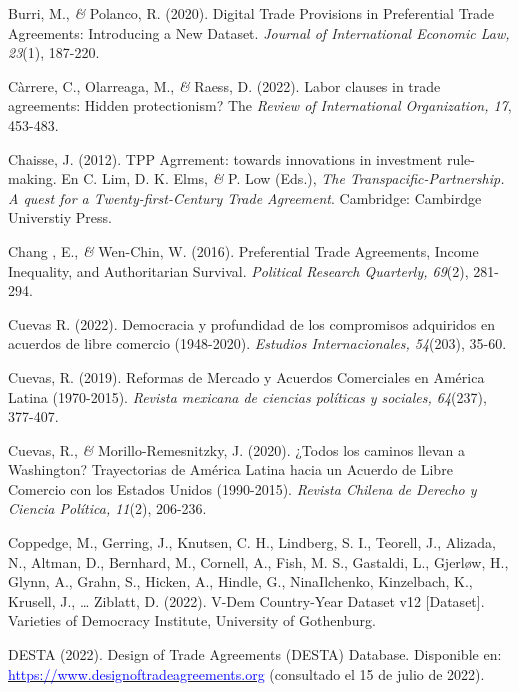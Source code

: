 \documentclass[a4paper]{tufte-handout}
\begin{document}
\begin{list}{}
\item{\small Burri, M., {\itshape \&} Polanco, R. (2020). Digital Trade Provisions in Preferential Trade Agreements: Introducing a New Dataset. {\itshape Journal of International Economic Law, 23}(1), 187-220.}

\item{\small Càrrere, C., Olarreaga, M., {\itshape \&} Raess, D. (2022). Labor clauses in trade agreements: Hidden protectionism? The {\itshape Review of International Organization, 17}, 453-483.}

\item{\small Chaisse, J. (2012). TPP Agrrement: towards innovations in investment rule-making. En C. Lim, D. K. Elms, {\itshape \&} P. Low (Eds.), {\itshape The Transpacific-Partnership. A quest for a Twenty-first-Century Trade Agreement}. Cambridge: Cambirdge Universtiy Press.}

\item{\small Chang , E., {\itshape \&} Wen-Chin, W. (2016). Preferential Trade Agreements, Income Inequality, and Authoritarian Survival. {\itshape Political Research Quarterly, 69}(2), 281-294.}

\item{\small Cuevas R. (2022). Democracia y profundidad de los compromisos adquiridos en acuerdos de libre comercio (1948-2020). {\itshape Estudios Internacionales, 54}(203), 35-60.}

\item{\small Cuevas, R. (2019). Reformas de Mercado y Acuerdos Comerciales en América Latina (1970-2015). {\itshape Revista mexicana de ciencias políticas y sociales, 64}(237), 377-407.}

\item{\small Cuevas, R., {\itshape \&} Morillo-Remesnitzky, J. (2020). ¿Todos los caminos llevan a Washington? Trayectorias de América Latina hacia un Acuerdo de Libre Comercio con los Estados Unidos (1990-2015). {\itshape Revista Chilena de Derecho y Ciencia Política, 11}(2), 206-236.}

\item{\small Coppedge, M., Gerring, J., Knutsen, C. H., Lindberg, S. I., Teorell, J., Alizada, N., Altman, D., Bernhard, M., Cornell, A., Fish, M. S., Gastaldi, L., Gjerløw, H., Glynn, A., Grahn, S., Hicken, A., Hindle, G., NinaIlchenko, Kinzelbach, K., Krusell, J., … Ziblatt, D. (2022). V-Dem Country-Year Dataset v12 [Dataset]. Varieties of Democracy Institute, University of Gothenburg.}

\item{\small DESTA (2022). Design of Trade Agreements (DESTA) Database. Disponible en: \href{https://www.designoftradeagreements.org/downloads}{\textcolor{blue}{https://www.designoftradeagreements.org}} (consultado el 15 de julio de 2022).}


\end{list}
\end{document}

